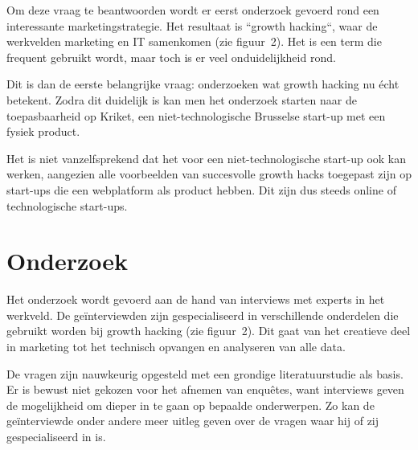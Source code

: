 \documentclass[a0,portrait]{a0poster}
\begin{document}
\begin{multicols}{2}
Om deze vraag te beantwoorden wordt er eerst onderzoek gevoerd rond een interessante marketingstrategie. Het resultaat is ``growth hacking``, waar de werkvelden marketing en IT samenkomen (zie figuur~2). Het is een term die frequent gebruikt wordt, maar toch is er veel onduidelijkheid rond.

Dit is dan de eerste belangrijke vraag: onderzoeken wat growth hacking nu écht betekent. Zodra dit duidelijk is kan men het onderzoek starten naar de toepasbaarheid op Kriket, een niet-technologische Brusselse start-up met een fysiek product. 

Het is niet vanzelfsprekend dat het voor een niet-technologische start-up ook kan werken, aangezien alle voorbeelden van succesvolle growth hacks toegepast zijn op start-ups die een webplatform als product hebben. Dit zijn dus steeds online of technologische start-ups.


\color{Black} %
\color{HoGentAccent1} 
\section*{Onderzoek}
\color{black}

Het onderzoek wordt gevoerd aan de hand van interviews met experts in het werkveld. De geïnterviewden zijn gespecialiseerd in verschillende onderdelen die gebruikt worden bij growth hacking (zie figuur~2). Dit gaat van het creatieve deel in marketing tot het technisch opvangen en analyseren van alle data. 

De vragen zijn nauwkeurig opgesteld met een grondige literatuurstudie als basis. Er is bewust niet gekozen voor het afnemen van enquêtes, want interviews geven de mogelijkheid om dieper in te gaan op bepaalde onderwerpen. Zo kan de geïnterviewde onder andere meer uitleg geven over de vragen waar hij of zij gespecialiseerd in is.

\color{HoGentAccent1} 
\color{black}

\begin{center}
\vspace{1cm}


\end{center}
\end{multicols}
\end{document}
